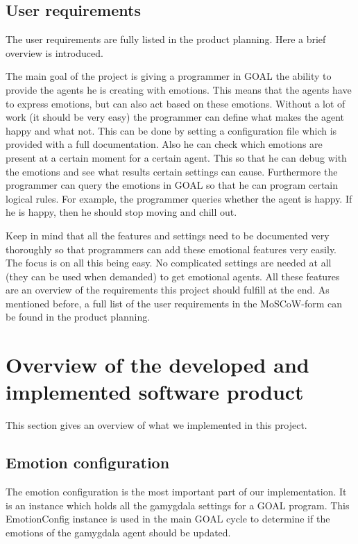 \documentclass[11pt]{article}
\begin{document}
\subsection{User requirements}
The user requirements are fully listed in the product planning. Here a brief overview is introduced.\par
The main goal of the project is giving a programmer in GOAL the ability to provide the agents he is creating with emotions. This means that the agents have to express emotions, but can also act based on these emotions. Without a lot of work (it should be very easy) the programmer can define what makes the agent happy and what not. This can be done by setting a configuration file which is provided with a full documentation. Also he can check which emotions are present at a certain moment for a certain agent. This so that he can debug with the emotions and see what results certain settings can cause. Furthermore the programmer can query the emotions in GOAL so that he can program certain logical rules. For example, the programmer queries whether the agent is happy. If he is happy, then he should stop moving and chill out.\par Keep in mind that all the features and settings need to be documented very thoroughly so that programmers can add these emotional features very easily. The focus is on all this being easy. No complicated settings are needed at all (they can be used when demanded) to get emotional agents. All these features are an overview of the requirements this project should fulfill at the end. As mentioned before, a full list of the user requirements in the MoSCoW-form can be found in the product planning.

\clearpage

\section{Overview of the developed and implemented software product}
This section gives an overview of what we implemented in this project. 

\subsection{Emotion configuration}
The emotion configuration is the most important part of our implementation. It is an instance which holds all the gamygdala settings for a GOAL program. This EmotionConfig instance is used in the main GOAL cycle to determine if the emotions of the gamygdala agent should be updated.
\end{document}
